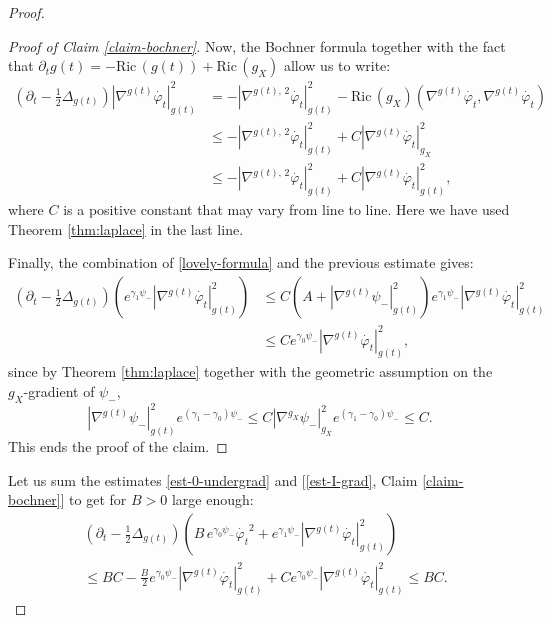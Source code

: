 \documentclass[10pt,a4paper]{amsart}
\newcommand{\Ric}{\mathrm{Ric} \,}
\newcommand{\f}{\varphi}
\begin{document}
\begin{proof}
\begin{proof}[Proof of Claim \ref{claim-bochner}]
Now, the Bochner formula together with the fact that $\partial_tg(t)=-\Ric(g(t))+\Ric(g_X)$ allow us to write:
\begin{equation*}
\begin{split}
\left(\partial_t-\frac{1}{2}\Delta_{g(t)}\right)|\nabla^{g(t)}\dot{\f_t}|^2_{g(t)}&=-|\nabla^{g(t),\,2}\dot{\f_t}|^2_{g(t)}-\Ric(g_X)(\nabla^{g(t)}\dot{\f_t},\nabla^{g(t)}\dot{\f_t})\\
&\leq -|\nabla^{g(t),\,2}\dot{\f_t}|^2_{g(t)}+C|\nabla^{g(t)}\dot{\f_t}|^2_{g_X}\\
&\leq -|\nabla^{g(t),\,2}\dot{\f_t}|^2_{g(t)}+C|\nabla^{g(t)}\dot{\f_t}|^2_{g(t)},
\end{split}
\end{equation*}
where $C$ is a positive constant that may vary from line to line. Here we have used Theorem \ref{thm:laplace} in the last line.

Finally, the combination of \eqref{lovely-formula} and the previous estimate gives: 
\begin{equation*}
\begin{split}
\left(\partial_t-\frac{1}{2}\Delta_{g(t)}\right)\left(e^{\gamma_1\psi_{-}}|\nabla^{g(t)}\dot{\f_t}|_{g(t)}^2\right)&\leq C\left(A+|\nabla^{g(t)}\psi_{-}|^2_{g(t)}\right)e^{\gamma_1\psi_{-}}|\nabla^{g(t)}\dot{\f_t}|_{g(t)}^2\\
&\leq Ce^{\gamma_0\psi_{-}}|\nabla^{g(t)}\dot{\f_t}|_{g(t)}^2,
\end{split}
\end{equation*}
since by Theorem \ref{thm:laplace} together with the geometric assumption on the $g_X$-gradient of $\psi_{-}$, 
$$
|\nabla^{g(t)}\psi_{-}|^2_{g(t)}e^{(\gamma_1-\gamma_0)\psi_{-}}
\leq C|\nabla^{g_X}\psi_{-}|_{g_X}^2e^{(\gamma_1-\gamma_0)\psi_{-}}\leq C.
$$
This ends the proof of the claim.
\end{proof}

Let us sum the estimates  \eqref{est-0-undergrad} and [\eqref{est-I-grad}, Claim \ref{claim-bochner}] to get for $B>0$ large enough:
\begin{equation*}
\begin{split}\label{est-I-grad-bis}
&\left(\partial_t-\frac{1}{2}\Delta_{g(t)}\right)\left(B\,e^{\gamma_0\psi_{-}}\dot{\f_t}^2+e^{\gamma_1\psi_{-}}|\nabla^{g(t)}\dot{\f_t}|_{g(t)}^2\right)\\
&\leq BC -\frac{B}{2}e^{\gamma_0\psi_{-}}|\nabla^{g(t)}\dot{\f_t}|^2_{g(t)} +Ce^{\gamma_0\psi_{-}}|\nabla^{g(t)}\dot{\f_t}|_{g(t)}^2
\leq BC.
\end{split}
\end{equation*}


\end{proof}
\end{document}
